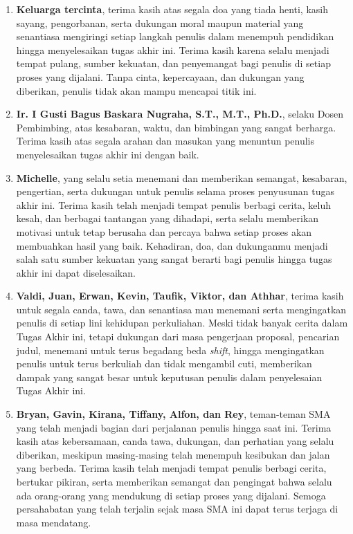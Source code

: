 \begin{enumerate}
    \item \textbf{Keluarga tercinta}, terima kasih atas segala doa yang tiada henti, kasih sayang, pengorbanan, 
    serta dukungan moral maupun material yang senantiasa mengiringi 
    setiap langkah penulis dalam menempuh pendidikan hingga menyelesaikan tugas akhir ini. Terima kasih karena selalu 
    menjadi tempat pulang, sumber kekuatan, dan penyemangat bagi penulis di setiap proses yang dijalani. 
    Tanpa cinta, kepercayaan, dan dukungan yang diberikan, penulis tidak akan mampu mencapai titik ini.
    \item \textbf{Ir. I Gusti Bagus Baskara Nugraha, S.T., M.T., Ph.D.}, selaku Dosen Pembimbing, atas kesabaran, waktu, dan bimbingan yang sangat berharga. Terima kasih atas segala arahan dan masukan yang menuntun penulis menyelesaikan tugas akhir ini dengan baik.
    \item \textbf{Michelle}, yang selalu setia menemani dan memberikan semangat, kesabaran, pengertian, serta dukungan untuk penulis selama proses penyusunan tugas akhir ini. 
    Terima kasih telah menjadi tempat penulis berbagi cerita, keluh kesah, dan berbagai tantangan yang dihadapi, serta selalu memberikan motivasi untuk tetap berusaha dan percaya bahwa setiap proses akan membuahkan hasil yang baik. 
    Kehadiran, doa, dan dukunganmu menjadi salah satu sumber kekuatan yang sangat berarti bagi penulis hingga tugas akhir ini dapat diselesaikan.
    \item \textbf{Valdi, Juan, Erwan, Kevin, Taufik, Viktor, dan Athhar}, terima kasih untuk segala canda, tawa, dan senantiasa mau menemani serta mengingatkan penulis di setiap lini kehidupan perkuliahan. Meski tidak banyak cerita dalam Tugas Akhir ini, tetapi dukungan dari masa pengerjaan proposal, pencarian judul, menemani untuk terus begadang beda \textit{shift}, hingga mengingatkan penulis untuk terus berkuliah dan tidak mengambil cuti, memberikan dampak yang sangat besar untuk keputusan penulis dalam penyelesaian Tugas Akhir ini.
    \item \textbf{Bryan, Gavin, Kirana, Tiffany, Alfon, dan Rey}, teman-teman SMA yang telah menjadi bagian dari perjalanan penulis hingga saat ini. Terima kasih atas kebersamaan, canda tawa, dukungan, dan 
    perhatian yang selalu diberikan, meskipun masing-masing telah menempuh kesibukan dan jalan yang berbeda. Terima kasih telah menjadi tempat penulis berbagi cerita, bertukar pikiran, 
    serta memberikan semangat dan pengingat bahwa selalu ada orang-orang yang mendukung di setiap proses yang dijalani. 
    Semoga persahabatan yang telah terjalin sejak masa SMA ini dapat terus terjaga di masa mendatang.
\end{enumerate}

